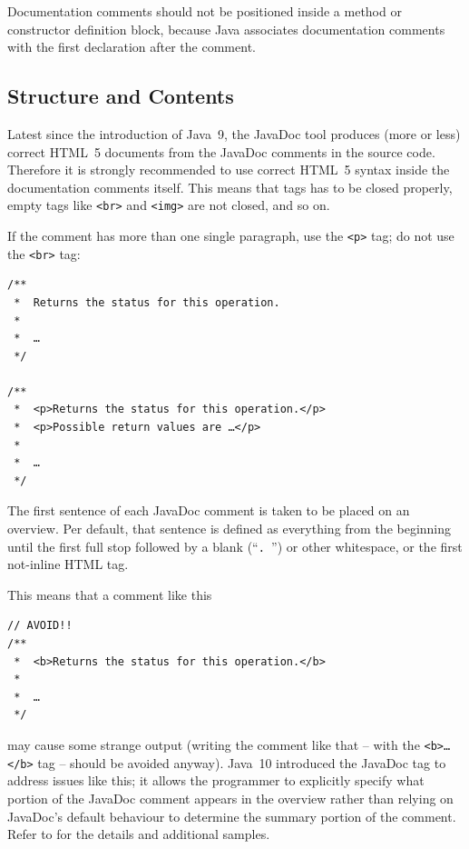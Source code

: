 \documentclass[11pt,a4paper, titlepage, parskip=half, headsepline, footsepline, cleardoublepage=current, headheight=1cm]{scrbook}
\begin{document}
Documentation comments should not be positioned inside a method or constructor definition block, because Java associates documentation comments with the first declaration after the comment.


\subsection{Structure and Contents}\label{sec:StructureAndContents}
Latest since the introduction of Java~9, the JavaDoc tool produces (more or less) correct HTML~5 documents from the JavaDoc comments in the source code. Therefore it is strongly recommended to use correct HTML~5 syntax inside the documentation comments itself. This means that tags has to be closed properly, empty tags like \verb#<br># and \verb#<img># are not closed, and so on.

If the comment has more than one single paragraph, use the \verb#<p># tag; do not use the \verb#<br># tag:

\begin{lstlisting}
/**
 *  Returns the status for this operation.
 *
 *  …
 */
 
/**
 *  <p>Returns the status for this operation.</p>
 *  <p>Possible return values are …</p>
 *
 *  …
 */
\end{lstlisting}

The first sentence of each JavaDoc comment is taken to be placed on an overview. Per default, that sentence is defined as everything from the beginning until the first full stop followed by a blank (“\verb#. #”) or other whitespace, or the first not-inline HTML tag.

This means that a comment like this

\begin{lstlisting}
// AVOID!!
/**
 *  <b>Returns the status for this operation.</b>
 *
 *  …
 */
\end{lstlisting}

may cause some strange output (writing the comment like that – with the \verb#<b>…</b># tag – should be avoided anyway). Java~10 introduced the JavaDoc tag  to address issues like this; it allows the programmer to explicitly specify what portion of the JavaDoc comment appears in the overview rather than relying on JavaDoc's default behaviour to determine the summary portion of the comment. Refer to \autocite{ORACLE_DOC_JAVADOC_TAG,DZONE_JAVADOC_SUMMARY} for the details and additional samples.
\end{document}
